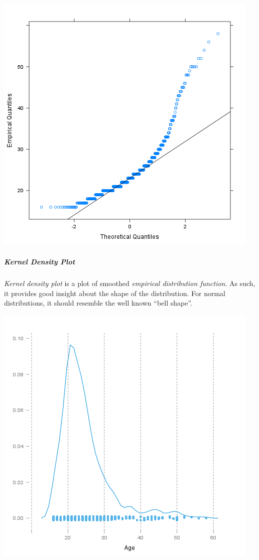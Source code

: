 \documentclass[]{article}
\makeatletter
\def\maxwidth{\ifdim\Gin@nat@width>\linewidth\linewidth
\else\Gin@nat@width\fi}
\let\Oldincludegraphics\includegraphics
\renewcommand{\includegraphics}[1]{\Oldincludegraphics[width=\maxwidth]{#1}}
\makeatother
\begin{document}
\href{/tmp/RtmpeIwHkw/file361e8e5f-hires.png}{\includegraphics{131f20f388f78bd4863828d9fed8c35c.png}}

\subparagraph{Kernel Density Plot}

\emph{Kernel density plot} is a plot of smoothed \emph{empirical
distribution function}. As such, it provides good insight about the
shape of the distribution. For normal distributions, it should resemble
the well known ``bell shape''.

\href{/tmp/RtmpeIwHkw/file4de24319-hires.png}{\includegraphics{a7ec6c240344a65f58d22a787409082c.png}}
\end{document}
